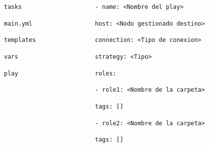 \documentclass{beamer}
\begin{document}
{\begin{columns}[T]
\begin{column}{.48\textwidth}
\begin{figure}
                    \hspace{1cm}
                    \texttt{tasks}
    
                        \hspace{1.8cm}
                        \texttt{main.yml}    
    
                    \hspace{1.5cm}
                    \texttt{templates}
    
                    \hspace{.95cm}
                    \texttt{vars}                
                    
            \hspace{.2cm}
            \texttt{play} 
    	\end{figure}
		\end{column}%
		\hspace{-3cm}
		\begin{column}{.48\textwidth}
			\begin{figure}
					\tiny
					\hspace{-1cm}
          \texttt{- name: <Nombre del play>} 
      
          \hspace{.1cm}
          \texttt{host: <Nodo gestionado destino>} 
      
          \hspace{.0cm}
          \texttt{connection: <Tipo de conexion>}
      
          \hspace{-1.55cm}
          \texttt{strategy: <Tipo>}
          
          \hspace{-2.65cm}
          \texttt{roles:}
      
              \hspace{.65cm}
              \texttt{- role1: <Nombre de la carpeta>}
      
              \hspace{-1.45cm}
              \texttt{tags: []}
      
              \hspace{.65cm}
              \texttt{- role2: <Nombre de la carpeta>}
      
              \hspace{-1.45cm}
              \texttt{tags: []}
			\end{figure}
		\end{column}%
		
		\end{columns}		
	}
	
\end{document}
